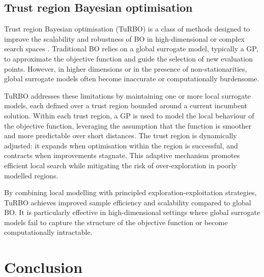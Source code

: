 \documentclass[11pt,a4paper]{article}
\begin{document}
\subsection{Trust region Bayesian optimisation}

Trust region Bayesian optimisation (TuRBO) is a class of methods designed to improve the scalability and robustness of BO in high-dimensional or complex search spaces \cite{Eriksson2019Scalable}.
Traditional BO relies on a global surrogate model, typically a GP, to approximate the objective function and guide the selection of new evaluation points.
However, in higher dimensions or in the presence of non-stationarities, global surrogate models often become inaccurate or computationally burdensome.

TuRBO addresses these limitations by maintaining one or more local surrogate models, each defined over a trust region bounded around a current incumbent solution.
Within each trust region, a GP is used to model the local behaviour of the objective function, leveraging the assumption that the function is smoother and more predictable over short distances.
The trust region is dynamically adjusted: it expands when optimisation within the region is successful, and contracts when improvements stagnate.
This adaptive mechanism promotes efficient local search while mitigating the risk of over-exploration in poorly modelled regions.

By combining local modelling with principled exploration-exploitation strategies, TuRBO achieves improved sample efficiency and scalability compared to global BO.
It is particularly effective in high-dimensional settings where global surrogate models fail to capture the structure of the objective function or become computationally intractable.


\section{Conclusion}




\end{document}
